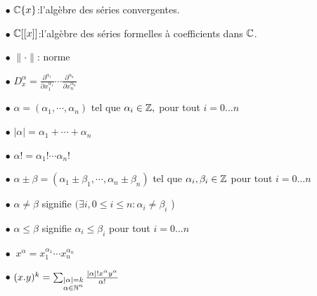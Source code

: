 \begin{itemize}


\item[$\bullet$]$\mathbb{C} \{x\}  $:l'algèbre des séries convergentes.\\
\item[$\bullet$]$\mathbb{C} [[x]]   $:l'algèbre des séries formelles à coefficients dans $\mathbb{C}$.\\
\item[$\bullet$]$\|\cdot \|$: norme \\
\item[$\bullet$]$\displaystyle D^\alpha_x = \frac{\partial^{\alpha_1}}{\partial x_1^{\alpha_1}} \cdots \frac{\partial^{\alpha_n}}{\partial x_n^{\alpha_n}}$   \\
\item[$\bullet$]$\alpha=(\alpha_1,\cdots,\alpha_n)$ tel que $\alpha_i \in \mathbb{Z},$ pour tout $i=0 \ldots n $\\
\item[$\bullet$]$ |\alpha|=\alpha_1+\cdots + \alpha_n$\\
\item[$\bullet$]$\alpha!=\alpha_1!\cdots \alpha_n!$\\
\item[$\bullet$]$ \alpha\pm \beta = (\alpha_1 \pm \beta_1,\cdots,\alpha_n \pm \beta_n)$ tel que $\alpha_i,\beta_i \in \mathbb{Z}$ pour tout $i=0 \ldots n $\\
\item[$\bullet$]$\alpha \neq \beta$ signifie $(\exists i, 0\leq i \leq n : \alpha_i \neq \beta_i$ )\\
\item[$\bullet$]$\alpha \leq \beta$ signifie $ \alpha_i \leq \beta_i$ pour tout $i=0 \ldots n $\\
\item[$\bullet$]$\ x^\alpha =x_1^{\alpha_1}\cdots x_n^{\alpha_n} $\\
\item[$\bullet$]$ (x.y)^k =\sum_{\begin{subarray}{c} |\alpha|=k \\ \alpha \in \mathbb{N}^n \end{subarray}} \frac{|\alpha|! x^\alpha y^\alpha}{\alpha!}$
\end{itemize}
